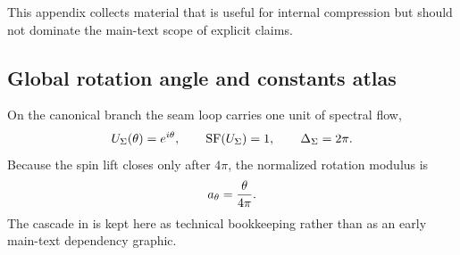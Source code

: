 This appendix collects material that is useful for internal compression but should not dominate the main-text scope of explicit claims.

\subsection{Global rotation angle and constants atlas}

On the canonical branch the seam loop carries one unit of spectral flow,
\[
U_{\Sigma}(\theta)=e^{i\theta},
\qquad
\operatorname{SF}(U_{\Sigma})=1,
\qquad
\Delta_{\Sigma}=2\pi.
\]
Because the spin lift closes only after $4\pi$, the normalized rotation modulus is
\[
a_\theta=\frac{\theta}{4\pi}.
\]
The cascade in  is kept here as technical bookkeeping rather than as an early main-text dependency graphic.

